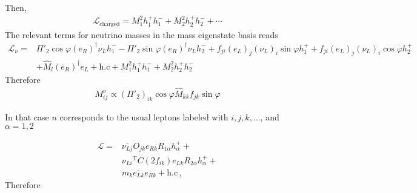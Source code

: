 Then,
\begin{align}
  \mathcal{L}_{\text{charged}}=M_1^2 h_1^+ h_1^-
+M_2^2 h_2^+ h_2^-+\cdots
\end{align}
The relevant terms for neutrino masses in the mass eigenstate basis reads
\begin{align}
  \mathcal{L}_{\nu}=&
\Pi'_2\cos\varphi \left( e_R \right)^{\dagger}\nu_L h_1^-
-\Pi'_2\sin\varphi \left( e_R \right)^{\dagger}\nu_L h_2^-
+f_{ji} \left( e_L \right)_j\left(\nu_L  \right)_i  \sin\varphi h_1^{+}
+f_{ji} \left( e_L \right)_j\left(\nu_L  \right)_i  \cos\varphi h_2^{+} \nonumber\\
&+\widehat{M}_l \left( e_R \right)^{\dagger}e_L+\text{h.c}
+M_1^2 h_1^+ h_1^-
+M_2^2 h_2^+ h_2^-
\end{align}
Therefore
\begin{align}
  M_{ij}^{\nu}\propto 
\left( \Pi'_2 \right)_{ik}\cos\varphi \widehat{M}_{kk} f_{jk}\sin\varphi
\end{align}




In that case $n$ corresponds to the usual leptons labeled with $i,j,k,\ldots$, and $\alpha=1,2$

\begin{align}
  \mathcal{L}=&\overline{\nu_{Lj}}O_{jk}e_{Rk}R_{1\alpha}h_{\alpha}^{+}+ \nonumber\\
              &{\nu_{Li}}^{\text{T}}C \left( 2 f_{ik} \right)e_{Lk}R_{2\alpha}h_{\alpha}^{+}+\nonumber\\
              &m_k  \overline{e_{Lk}} e_{Rk}+\text{h.c}\,,
\end{align}
Therefore

